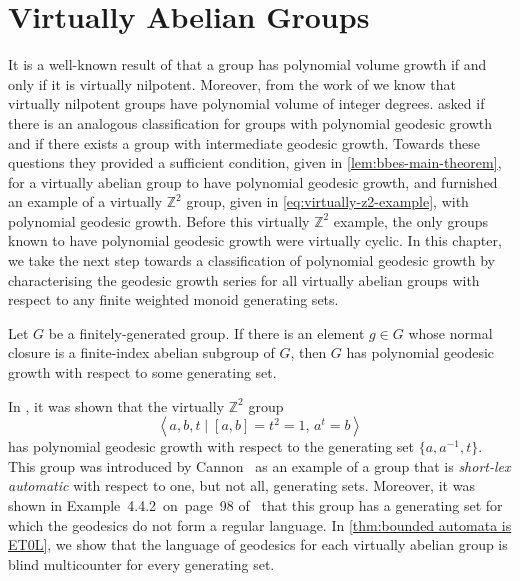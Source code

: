 \chapter{Virtually Abelian Groups}\label{chapter:polynomial-geodesic-growth}%
\label{sec:virtually-abelian-groups}

It is a well-known result of \textcite{gromov1981} that a group has polynomial volume growth if and only if it is virtually nilpotent.
Moreover, from the work of \textcite{bass1972} we know that virtually nilpotent groups have polynomial volume of integer degrees.
\Textcite{bridson2012} asked if there is an analogous classification for groups with polynomial geodesic growth and if there exists a group with intermediate geodesic growth.
Towards these questions they provided a sufficient condition, given in \cref{lem:bbes-main-theorem}, for a virtually abelian group to have polynomial geodesic growth, and furnished an example of a virtually $\mathbb{Z}^2$ group, given in \cref{eq:virtually-z2-example}, with polynomial geodesic growth.
Before this virtually $\mathbb{Z}^2$ example, the only groups known to have polynomial geodesic growth were virtually cyclic.
In this chapter, we take the next step towards a classification of polynomial geodesic growth by characterising the geodesic growth series for all virtually abelian groups with respect to any finite weighted monoid generating sets.

\begin{lemma}\label{lem:bbes-main-theorem}
	Let $G$ be a finitely-generated group.
	If there is an element $g \in G$ whose normal closure is a finite-index abelian subgroup of $G$, then $G$ has polynomial geodesic growth with respect to some generating set.
\end{lemma}

In \cite{bridson2012}, it was shown that the virtually $\mathbb{Z}^2$ group
\begin{equation}\label{eq:virtually-z2-example}
	\left\langle
		a,b,t
	\mid
		[a,b] = t^2 = 1,\,
		a^t = b
	\right\rangle
\end{equation}
has polynomial geodesic growth with respect to the generating set $\{a,a^{-1},t\}$.
This group was introduced by Cannon~\cite[Example~4.4.1~on~p.~97]{epstein1992} as an example of a group that is \textit{short-lex automatic} with respect to one, but not all, generating sets.
Moreover, it was shown in Example~4.4.2~on~page~98 of~\cite{epstein1992} that this group has a generating set for which the geodesics do not form a regular language.
In \cref{thm:bounded automata is ET0L}, we show that the language of geodesics for each virtually abelian group is blind multicounter for every generating set.

